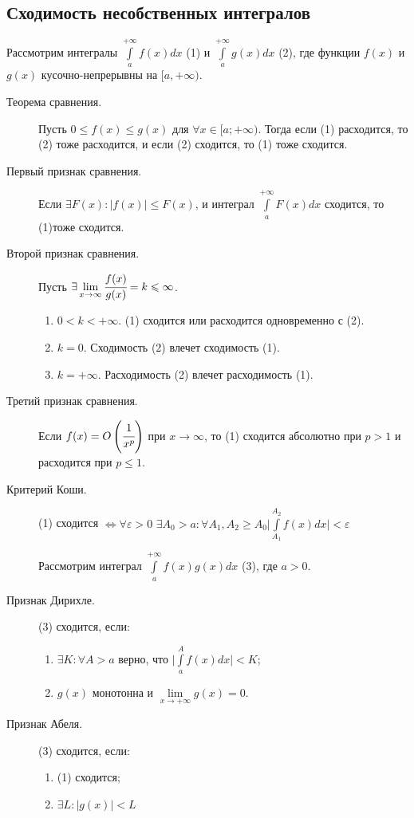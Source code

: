 \documentclass[a4paper,12pt]{scrartcl}
\begin{document}
\subsection{Сходимость несобственных интегралов}
Рассмотрим интегралы $\int\limits_{a}^{+\infty}{f(x)dx} $ (1) и $\int\limits_{a}^{+\infty}{g(x)dx}$ (2), где функции $f(x)$ и $g(x)$ кусочно-непрерывны на $[a,+\infty)$.
\begin{description}
 \item[Теорема сравнения.] Пусть $0 \leqslant f(x) \leqslant g(x)$ для $\forall x \in [a;+\infty)$. Тогда если (1) расходится, то (2) тоже расходится, и если (2) сходится, то (1) тоже сходится.
\item[Первый признак сравнения.] Если $\exists F(x): |f(x)| \leqslant F(x)$, и интеграл $\int\limits_{a}^{+\infty}{F(x)dx}$ сходится, то (1)тоже сходится.
\item[Второй признак сравнения.] Пусть $\exists \lim\limits_{x\to\infty}\cfrac{f(x)}{g(x)} = k \leqslant \infty$.
\begin{enumerate}
 \item $0<k<+\infty$. (1) сходится или расходится одновременно с (2).
 \item $k = 0$. Сходимость (2) влечет сходимость (1).
 \item $k = +\infty$. Расходимость (2) влечет расходимость (1).
\end{enumerate}
\item[Третий признак сравнения.] Если $f(x) = O\left(\cfrac{1}{x^p}\right)$ при $x\to\infty$, то (1) сходится абсолютно при $p>1$ и расходится при $p \leqslant 1$.
\item[Критерий Коши.] (1) сходится $\Leftrightarrow \forall \varepsilon > 0$ $\exists A_{0} > a: \forall A_{1},A_{2} \geqslant A_{0}$\quad$\bigl| \int\limits_{A_{1}}^{A_{2}}{f(x)dx} \bigl| < \varepsilon$ 

Рассмотрим интеграл $\int\limits_{a}^{+\infty}{f(x)g(x)dx}$ (3), где $ a > 0$.

\item[Признак Дирихле.] (3) сходится, если:
\begin{enumerate}
 \item $\exists K: \forall A > a$ верно, что $\bigl| \int\limits_{a}^{A}{f(x)dx} \bigl| < K$;
 \item $g(x)$ монотонна и $\lim\limits_{x\to +\infty}g(x) = 0$.
\end{enumerate}
\item[Признак Абеля.] (3) сходится, если:
\begin{enumerate}
 \item (1) сходится;
 \item $\exists L: |g(x)| < L$ 
\end{enumerate}

\end{description}
\end{document}
